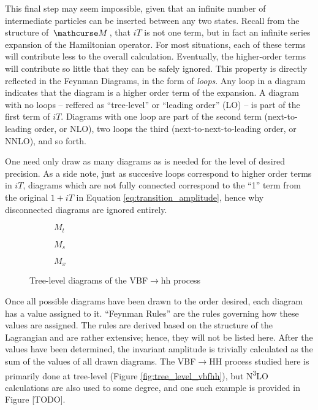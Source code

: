     This final step may seem impossible, given that an infinite number of intermediate particles can be inserted between any two states.
    Recall from the structure of $\invAmp$, that $iT$ is not one term, but in fact an infinite series expansion of the Hamiltonian operator.
    For most situations, each of these terms will contribute less to the overall calculation.
    Eventually, the higher-order terms will contribute so little that they can be safely ignored.
    This property is directly reflected in the Feynman Diagrams, in the form of \textit{loops}.
    Any loop in a diagram indicates that the diagram is a higher order term of the expansion.
    A diagram with no loops -- reffered as ``tree-level'' or ``leading order'' (LO) -- is part of the first term of $iT$.
    Diagrams with one loop are part of the second term (next-to-leading order, or NLO),
        two loops the third (next-to-next-to-leading order, or NNLO), and so forth.

    One need only draw as many diagrams as is needed for the level of desired precision.
    As a side note, just as succesive loops correspond to higher order terms in $iT$,
        diagrams which are not fully connected correspond to the ``1'' term from the original $1+iT$ in Equation \ref{eq:transition_amplitude},
        hence why disconnected diagrams are ignored entirely.

    \begin{figure} \label{fig:tree_level_vbfhh}
    \centering
    \begin{subfigure}[$M_t$]{0.3\textwidth} 
         
        \caption{$M_t$}
        \label{fig:tree_level_vbfhh:kv}
    \end{subfigure}
    \begin{subfigure}{0.3\textwidth}
         
        \caption{$M_s$}
        \label{fig:tree_level_vbfhh:kl}
    \end{subfigure}
    \begin{subfigure}{0.3\textwidth}
         
        \caption{$M_x$}
        \label{fig:tree_level_vbfhh:k2v}
    \end{subfigure}
    \caption{Tree-level diagrams of the VBF$\rightarrow$hh process}
    \end{figure}

    Once all possible diagrams have been drawn to the order desired, each diagram has a value assigned to it.
    ``Feynman Rules'' are the rules governing how these values are assigned.
    The rules are derived based on the structure of the Lagrangian and are rather extensive;
        hence, they will not be listed here.
    After the values have been determined, the invariant amplitude is trivially calculated as the sum of the values of all drawn diagrams.
    The VBF$\to$HH process studied here is primarily done at tree-level (Figure \ref{fig:tree_level_vbfhh}),
        but N\textsuperscript{3}LO calculations are also used to some degree, and one such example is provided in Figure [TODO]. %

